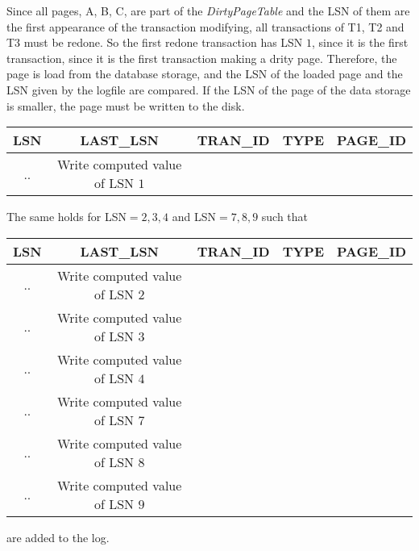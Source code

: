 \begin{exercise}{6}
  \begin{subexercise}
      Since all pages, A, B, C, are part of the \emph{DirtyPageTable} and the LSN of them are the first appearance of the transaction modifying, all transactions of T1, T2 and T3 must be redone. So the first redone transaction has LSN $1$, since it is the first transaction, since it is the first transaction making a drity page. Therefore, the page is load from the database storage, and the LSN of the loaded page and the LSN given by the logfile are compared. If the LSN of the page of the data storage is smaller, the page must be written to the disk.
    \begin{center}
      \begin{tabular}{ c | c | c | c | c }
        LSN & LAST\_LSN & TRAN\_ID & TYPE & PAGE\_ID \\ \hline
        ..  & Write computed value of LSN $1$ & & & \\
      \end{tabular}
    \end{center}
    The same holds for LSN$=2,3,4$ and LSN$=7,8,9$ such that 
    \begin{center}
      \begin{tabular}{ c | c | c | c | c }
        LSN & LAST\_LSN & TRAN\_ID & TYPE & PAGE\_ID \\ \hline
        ..  & Write computed value of LSN $2$ & & & \\
        ..  & Write computed value of LSN $3$ & & & \\
        ..  & Write computed value of LSN $4$ & & & \\
        ..  & Write computed value of LSN $7$ & & & \\
        ..  & Write computed value of LSN $8$ & & & \\
        ..  & Write computed value of LSN $9$ & & & \\
      \end{tabular}
    \end{center}
    are added to the log.

      
  \end{subexercise}


\end{exercise}

